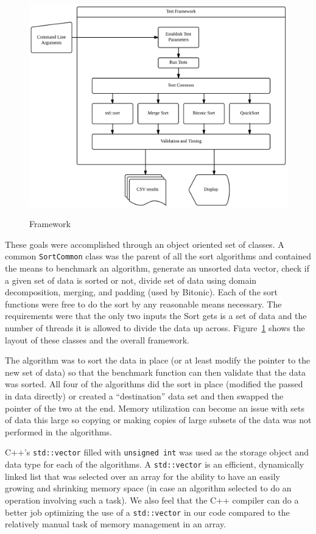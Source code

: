 \documentclass[journal]{IEEEtran}
\begin{document}
\begin{figure}[t]
  \caption{Framework}
  \centering
  \includegraphics[width=.75\textwidth]{framework.png}
  \label{fig:framework}
\end{figure}

These goals were accomplished through an object oriented set of classes. A common \texttt{SortCommon} class was the parent of all the sort algorithms and contained the means to benchmark an algorithm, generate an unsorted data vector, check if a given set of data is sorted or not, divide set of data using domain decomposition, merging, and padding (used by Bitonic). Each of the sort functions were free to do the sort by any reasonable means necessary. The requirements were that the only two inputs the Sort gets is a set of data and the number of threads it is allowed to divide the data up across. Figure~\ref{fig:framework} shows the layout of these classes and the overall framework.

The algorithm was to sort the data in place (or at least modify the pointer to the new set of data) so that the benchmark function can then validate that the data was sorted. All four of the algorithms did the sort in place (modified the passed in data directly) or created a ``destination'' data set and then swapped the pointer of the two at the end. Memory utilization can become an issue with sets of data this large so copying or making copies of large subsets of the data was not performed in the algorithms.

C++'s \texttt{std::vector} filled with \texttt{unsigned int} was used as the storage object and data type for each of the algorithms. A \texttt{std::vector} is an efficient, dynamically linked list that was selected over an array for the ability to have an easily growing and shrinking memory space (in case an algorithm selected to do an operation involving such a task). We also feel that the C++ compiler can do a better job optimizing the use of a \texttt{std::vector} in our code compared to the relatively manual task of memory management in an array.
\end{document}
